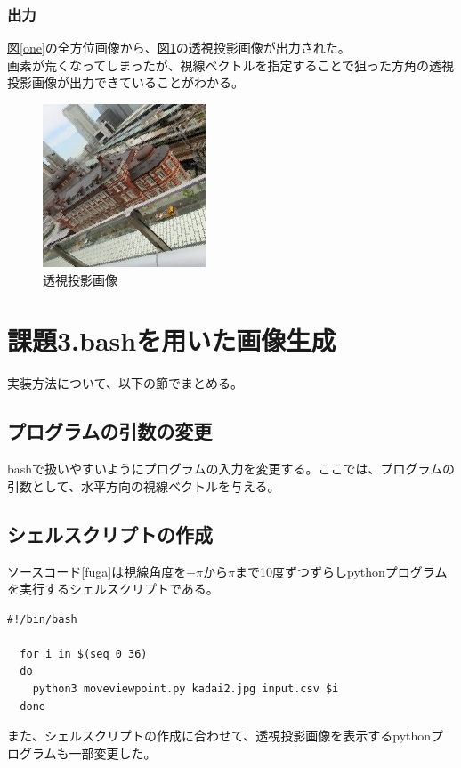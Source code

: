 \documentclass[]{jarticle}          %
\begin{document}
\subsubsection{出力}
\hyperref[one]{図\ref{one}}の全方位画像から、\hyperref[two]{図\ref{two}}の透視投影画像が出力された。 \\
 画素が荒くなってしまったが、視線ベクトルを指定することで狙った方角の透視投影画像が出力できていることがわかる。
\begin{figure}[!ht]
  \begin{center}
    \includegraphics[scale=1.0]{figures/img_perspective.jpg}
    \caption{透視投影画像}
    \label{two}
  \end{center}
\end{figure}

\section{課題3.bashを用いた画像生成}
実装方法について、以下の節でまとめる。

\subsection{プログラムの引数の変更}
bashで扱いやすいようにプログラムの入力を変更する。ここでは、プログラムの引数として、水平方向の視線ベクトルを与える。
\subsection{シェルスクリプトの作成}
ソースコード\ref{fuga}は視線角度を$-\pi$から$\pi$まで10度ずつずらしpythonプログラムを実行するシェルスクリプトである。
\begin{lstlisting}[caption=連続な透視投影画像を表示,label=fuga]
  #!/bin/bash

  for i in $(seq 0 36)
  do
    python3 moveviewpoint.py kadai2.jpg input.csv $i
  done
\end{lstlisting}
また、シェルスクリプトの作成に合わせて、透視投影画像を表示するpythonプログラムも一部変更した。
\end{document}
